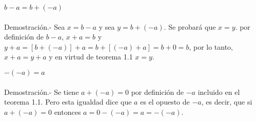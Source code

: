 \begin{teo}
$b-a=b+(-a)$\\\\
Demostración.- \; Sea $x=b-a$ y sea $y=b+(-a)$. Se probará que $x=y$. por definición de $b-a$, $x+a=b$ y $y+a=\left[ b+(-a)\right]+a=b+\left[ (-a)+a \right]=b+0=b$, por lo tanto, $x+a=y+a$ y en virtud de teorema 1.1 $x=y$.
\end{teo}

\begin{teo}
$-(-a)=a$\\\\
Demostración.- \;
Se tiene $a+(-a)=0$ por definición de $-a$ incluido en el teorema 1.1. Pero esta igualdad dice que $a$ es el opuesto de $-a$, es decir, que si $a+(-a)=0$ entonces $a=0-(-a)=a=-(-a)$.
\end{teo}

